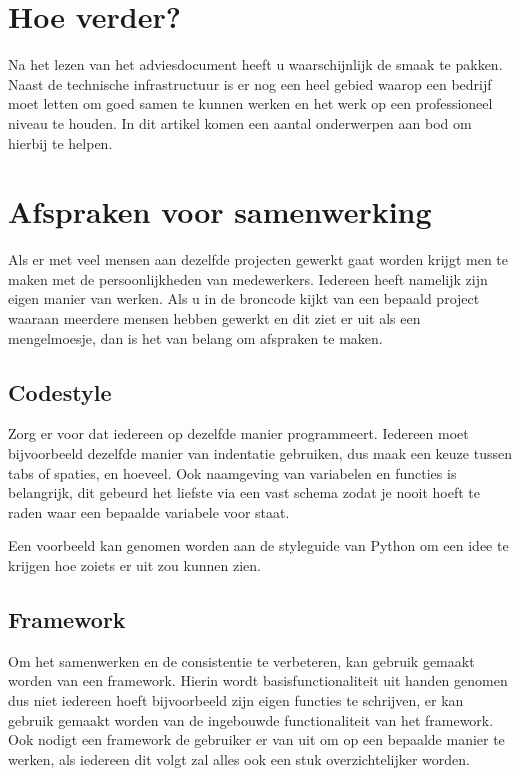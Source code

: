 \documentclass[12pt, a4paper]{article}
\begin{document}
\section*{Hoe verder?}

Na het lezen van het adviesdocument heeft u waarschijnlijk de smaak te pakken. Naast de technische infrastructuur is er nog een heel gebied waarop een bedrijf moet letten om goed samen te kunnen werken en het werk op een professioneel niveau te houden. In dit artikel komen een aantal onderwerpen aan bod om hierbij te helpen.

\section{Afspraken voor samenwerking}

Als er met veel mensen aan dezelfde projecten gewerkt gaat worden krijgt men te maken met de persoonlijkheden van medewerkers. Iedereen heeft namelijk zijn eigen manier van werken. Als u in de broncode kijkt van een bepaald project waaraan meerdere mensen hebben gewerkt en dit ziet er uit als een mengelmoesje, dan is het van belang om afspraken te maken.

\subsection{Codestyle}

Zorg er voor dat iedereen op dezelfde manier programmeert. Iedereen moet bijvoorbeeld dezelfde manier van indentatie gebruiken, dus maak een keuze tussen tabs of spaties, en hoeveel. Ook naamgeving van variabelen en functies is belangrijk, dit gebeurd het liefste via een vast schema zodat je nooit hoeft te raden waar een bepaalde variabele voor staat.

Een voorbeeld kan genomen worden aan de styleguide van Python\cite{python} om een idee te krijgen hoe zoiets er uit zou kunnen zien.

\subsection{Framework}

Om het samenwerken en de consistentie te verbeteren, kan gebruik gemaakt worden van een framework. Hierin wordt basisfunctionaliteit uit handen genomen dus niet iedereen hoeft bijvoorbeeld zijn eigen functies te schrijven, er kan gebruik gemaakt worden van de ingebouwde functionaliteit van het framework. Ook nodigt een framework de gebruiker er van uit om op een bepaalde manier te werken, als iedereen dit volgt zal alles ook een stuk overzichtelijker worden.
\end{document}
